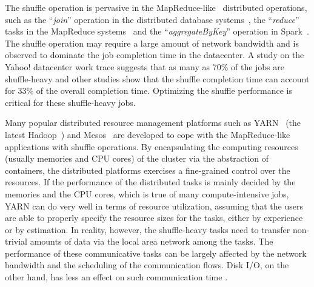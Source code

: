 \documentclass[10pt,journal,compsoc]{IEEEtran}
\begin{document}
% 
% 
% 
% 




 

The shuffle operation is pervasive in the MapReduce-like~\cite{dean2008mapreduce} distributed operations, 
such as the ``\emph{join}'' operation in the distributed database systems~\cite{thusoo2009hive, Yu:2008:DSG,Armbrust:2015:SSR}, 
the ``\emph{reduce}'' tasks in the MapReduce systems~\cite{dean2008mapreduce,vavilapalli2013apache}
and the ``\emph{aggregateByKey}'' operation in Spark~\cite{zaharia2012resilient}.
The shuffle operation may require a large amount of network bandwidth 
and is observed to dominate the job completion time in the datacenter.
A study on the Yahoo! datacenter work trace suggests that as many as 70\% of 
the jobs are shuffle-heavy and other studies show that the shuffle completion time
can account for 33\% of the overall completion time.
Optimizing the shuffle performance is critical for these
shuffle-heavy jobs.


Many popular distributed resource management platforms such as YARN~\cite{vavilapalli2013apache} (the latest Hadoop~\cite{white2015hadoop}) and Mesos~\cite{hindman2011mesos} are developed to cope with the 
MapReduce-like applications with shuffle operations. 
By encapsulating the computing resources (usually memories and CPU cores) of the cluster via the abstraction of containers, 
the distributed platforms exercises a fine-grained control over the resources. 
If the performance of the distributed tasks is mainly decided by the
memories and the CPU cores, which is true of
many compute-intensive jobs, YARN can do very well in terms of resource
utilization, assuming that the users are able to properly specify 
the resource sizes for the tasks, either by experience or by estimation. 
In reality, however, the shuffle-heavy tasks need to transfer 
non-trivial amounts of data via the local area network among the tasks.
The performance of these 
communicative tasks can be largely
affected by the network bandwidth and the scheduling of the communication flows. 
Disk I/O, on the other hand, has less an effect on such communication time \cite{kavulya2010analysis}.
\end{document}
